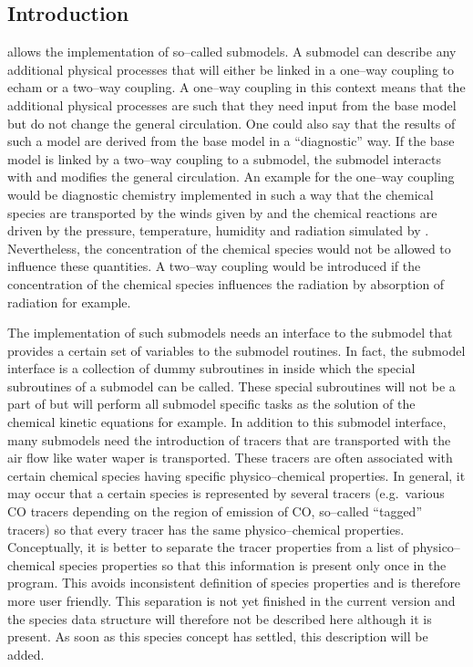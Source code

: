 \subsection{Introduction}

\echam{} allows the implementation of so--called submodels. A submodel
can describe any additional physical processes that will either be linked in
a one--way coupling to echam or a two--way coupling. A one--way
coupling in this context means that the additional physical processes
are such that they need input from the \echam{} base model but do not
change the general circulation. One could also say that the results of
such a model are derived from the \echam{} base model in a
``diagnostic'' way. If the base model is linked by a two--way coupling
to a submodel, the submodel interacts with \echam{} and modifies the
general circulation. An example for the one--way coupling would be
diagnostic chemistry implemented in such a way that the chemical
species are transported by the winds given by \echam{} and the
chemical reactions are driven by the pressure, temperature, humidity
and radiation simulated by \echam. Nevertheless, the concentration of
the chemical species would not be allowed to influence these
quantities. A two--way coupling would be introduced if the
concentration of the chemical species influences the radiation by
absorption of radiation for example. 

The implementation of such submodels needs an interface to the submodel
that provides a certain set of variables to the submodel routines.
In fact, the submodel interface is a collection of dummy subroutines
in \echam{} inside which the special 
subroutines of a submodel can be called. These special subroutines
will not be a part of \echam{} but will perform all submodel specific tasks
as the solution of the chemical kinetic equations for example.
In addition to this submodel interface, many submodels need the
introduction of tracers that are transported with the air flow like
water waper is transported. These tracers are often associated with
certain chemical species having specific physico--chemical
properties. In general, it may occur that a certain species is
represented by several tracers (e.g.~various CO tracers depending on
the region of emission of CO, so--called ``tagged'' tracers) so that
every tracer has the same physico--chemical properties. Conceptually,
it is better to separate the tracer properties from a list of
physico--chemical species properties so that this information is
present only once in the program. This avoids inconsistent definition
of species properties and is therefore more user friendly. This
separation is not yet finished in the current \echam{} version and the
species data structure will therefore not be described here although
it is present. As soon as this species concept has settled, this
description will be added.

